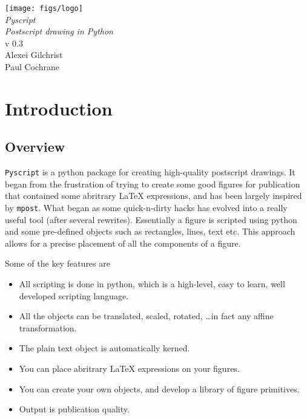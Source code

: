 \documentclass[a4paper]{book}
\begin{document}
\begin{titlepage}
\begin{center}
\vspace*{3cm}
\LARGE

\texttt{[image: figs/logo]}\\[4cm]

{\Huge \emph{Pyscript}}\\[1cm]
\emph{Postscript drawing in Python}\\[2cm]

v 0.3\\[2cm]

Alexei Gilchrist\\
Paul Cochrane
\end{center}
\end{titlepage}

\frontmatter

\tableofcontents

\mainmatter

\chapter{Introduction}
\label{cha:introduction}


\section{Overview}

\Verb|Pyscript| is a python package for creating high-quality postscript
drawings.  It began from the frustration of trying to create some good figures
for publication that contained some abritrary \LaTeX{} expressions, and has
been largely inspired by \Verb|mpost|. What began as some quick-n-dirty hacks
has evolved into a really useful tool (after several rewrites). Essentially a
figure is scripted using python and some pre-defined objects such as
rectangles, lines, text etc. This approach allows for a precise placement of
all the components of a figure.

Some of the key features are
\begin{itemize}
\item All scripting is done in python, which is a high-level, easy to
  learn, well developed scripting language.
\item All the objects can be translated, scaled, rotated, \ldots in fact any
affine transformation.  
\item The plain text object is automatically kerned.
\item You can place abritrary \LaTeX{} expressions on your figures.
\item You can create your own objects, and develop a library of figure 
primitives. 
\item Output is publication quality.
\end{itemize}
\end{document}
